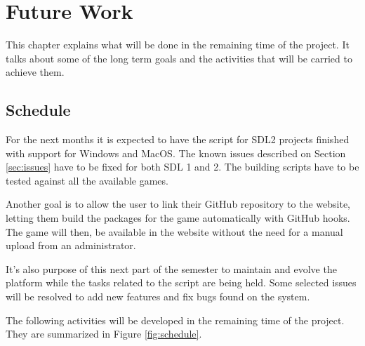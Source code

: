 
\chapter{Future Work}
\label{sec:future_work}

This chapter explains what will be done in the remaining time of the project. It talks about some of the long term goals and the activities that will be carried to achieve them.

\section{Schedule}
\label{sec:schedule}

For the next months it is expected to have the script for SDL2 projects finished with support for Windows and MacOS. The known issues described on Section \ref{sec:issues} have to be fixed for both SDL 1 and 2. The building scripts have to be tested against all the available games.

Another goal is to allow the user to link their GitHub repository to the website, letting them build the packages for the game automatically with GitHub hooks. The game will then, be available in the website without the need for a manual upload from an administrator.

It's also purpose of this next part of the semester to maintain and evolve the platform while the tasks related to the script are being held. Some selected issues will be resolved to add new features and fix bugs found on the system.

The following activities will be developed in the remaining time of the project. They are summarized in Figure \ref{fig:schedule}.

